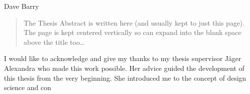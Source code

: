 \documentclass[
11pt, %
english, %
singlespacing, %
headsepline, %
]{MastersDoctoralThesis} %
\begin{document}
\hfill Dave Barry


\begin{abstract}
\addchaptertocentry{\abstractname} %
The Thesis Abstract is written here (and usually kept to just this page). The page is kept centered vertically so can expand into the blank space above the title too\ldots
\end{abstract}


\begin{acknowledgements}
\addchaptertocentry{\acknowledgementname} %
I would like to acknowledge and give my thanks to my thesis supervisor Jäger Alexandra who made this work possible.
Her advice guided the development of this thesis from the very beginning. 
She introduced me to the concept of design science and con
\end{acknowledgements}


\tableofcontents %

\listoffigures %

\listoftables %

\end{document}
